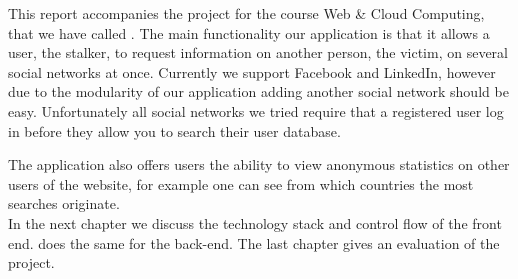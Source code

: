 
This report accompanies the project for the course Web \& Cloud Computing, that we have called \stalker. The main functionality our application \stalker is that it allows a user, the stalker, to request information on another person, the victim, on several social networks at once. Currently we support Facebook and LinkedIn, however due to the modularity of our application adding another social network should be easy. Unfortunately all social networks we tried require that a registered user log in before they allow you to search their user database.

The application also offers users the ability to view anonymous statistics on other users of the website, for example one can see from which countries the most searches originate. \\

In the next chapter we discuss the technology stack and control flow of the front end.  does the same for the back-end. The last chapter gives an evaluation of the project. 

